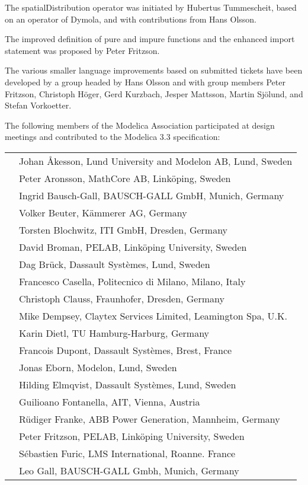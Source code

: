 \documentclass[../MLS.tex]{subfiles}
\begin{document}
The spatialDistribution operator was initiated by Hubertus Tummescheit,
based on an operator of Dymola, and with contributions from Hans Olsson.

The improved definition of pure and impure functions and the enhanced
import statement was proposed by Peter Fritzson.

The various smaller language improvements based on submitted tickets
have been developed by a group headed by Hans Olsson and with group
members Peter Fritzson, Christoph Höger, Gerd Kurzbach, Jesper Mattsson,
Martin Sjölund, and Stefan Vorkoetter.

The following members of the Modelica Association participated at design
meetings and contributed to the Modelica 3.3 specification:

\begin{longtable}{p{0.3cm}p{14cm}}
&Johan Åkesson, Lund University and Modelon AB, Lund, Sweden\\
&Peter Aronsson, MathCore AB, Linköping, Sweden\\
&Ingrid Bausch-Gall, BAUSCH-GALL GmbH, Munich, Germany\\
&Volker Beuter, Kämmerer AG, Germany\\
&Torsten Blochwitz, ITI GmbH, Dresden, Germany\\
&David Broman, PELAB, Linköping University, Sweden\\
&Dag Brück, Dassault Systèmes, Lund, Sweden\\
&Francesco Casella, Politecnico di Milano, Milano, Italy\\
&Christoph Clauss, Fraunhofer, Dresden, Germany\\
&Mike Dempsey, Claytex Services Limited, Leamington Spa, U.K.\\
&Karin Dietl, TU Hamburg-Harburg, Germany\\
&Francois Dupont, Dassault Systèmes, Brest, France\\
&Jonas Eborn, Modelon, Lund, Sweden\\
&Hilding Elmqvist, Dassault Systèmes, Lund, Sweden\\
&Guilioano Fontanella, AIT, Vienna, Austria\\
&Rüdiger Franke, ABB Power Generation, Mannheim, Germany\\
&Peter Fritzson, PELAB, Linköping University, Sweden\\
&Sébastien Furic, LMS International, Roanne. France\\
&Leo Gall, BAUSCH-GALL Gmbh, Munich, Germany\\

\end{longtable}
\end{document}
